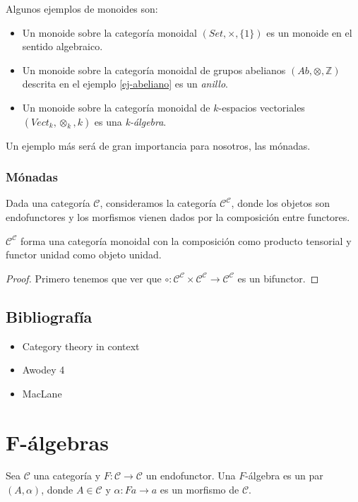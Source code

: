 \documentclass[12pt, twoside]{book}
\newcommand{\newterm}[1]{\index{#1}\emph{#1}}
\newcommand{\cat}{{\mathcal{C}}}
\newcommand{\Set}{{Set}}
\newcommand{\Ab}{{Ab}}
\newcommand{\Vect}{{Vect}}
\newcommand{\Z}{{\mathbb{Z}}}
\begin{document}
\begin{example}
Algunos ejemplos de monoides son:
\begin{itemize}
  \item Un monoide sobre la categoría monoidal $(\Set, \times, \{1\})$ es un monoide en el sentido algebraico.
  \item Un monoide sobre la categoría monoidal de grupos abelianos $(\Ab, \otimes, \Z)$ descrita en el ejemplo \ref{ej-abeliano} es un \newterm{anillo}.
  \item Un monoide sobre la categoría monoidal de $k$-espacios vectoriales $(\Vect_k, \otimes_k, k)$ es una \newterm{k-álgebra}.
\end{itemize}

Un ejemplo más será de gran importancia para nosotros, las mónadas.

\subsection{Mónadas}
Dada una categoría $\cat$, consideramos la categoría $\cat^\cat$, donde los objetos son endofunctores y los morfismos vienen dados por la composición entre functores.

\begin{proposition}
$\cat^\cat$ forma una categoría monoidal con la composición como producto tensorial y functor unidad como objeto unidad.
\end{proposition}
\begin{proof}
Primero tenemos que ver que $\circ \colon \cat^\cat \times \cat^\cat \to \cat^\cat$ es un bifunctor.
\end{proof}
\end{example}

\section{Bibliografía}
\begin{itemize}
  \item Category theory in context
  \item Awodey 4
  \item MacLane
\end{itemize}

\chapter{F-álgebras}
\begin{definition}
Sea $\cat$ una categoría y $F \colon \cat \to \cat$ un endofunctor.
Una $F$-álgebra es un par $(A,\alpha)$, donde $A \in \cat$ y $\alpha \colon F a \to a$ es un morfismo de $\cat$.
\end{definition}
\end{document}
